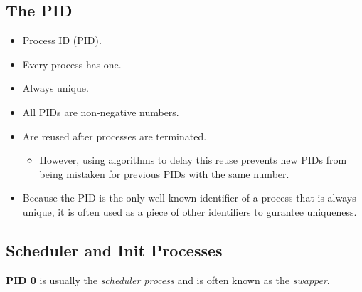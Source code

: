 \documentclass{article}
\begin{document}
\subsection{The PID}
\begin{itemize}
    \item Process ID (PID).
    \item Every process has one.
    \item Always unique.
    \item All PIDs are non-negative numbers.
    \item Are reused after processes are terminated.
        \begin{itemize}
            \item However, using algorithms to delay this 
                reuse prevents new PIDs from being mistaken 
                for previous PIDs with the same number.
        \end{itemize}
    \item Because the PID is the only well known identifier 
        of a process that is always unique, it is often used 
        as a piece of other identifiers to gurantee uniqueness.

\end{itemize}


\subsection{Scheduler and Init Processes}

\textbf{PID 0} is usually the \emph{scheduler process} and is 
often known as the \emph{swapper}.
\end{document}

